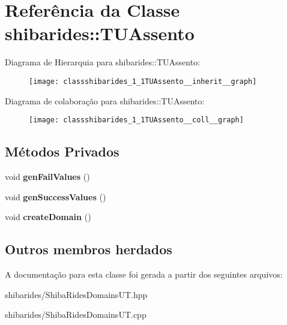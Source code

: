 \hypertarget{classshibarides_1_1TUAssento}{}\section{Referência da Classe shibarides\+:\+:T\+U\+Assento}
\label{classshibarides_1_1TUAssento}


Diagrama de Hierarquia para shibarides\+:\+:T\+U\+Assento\+:\nopagebreak
\begin{figure}[H]
\begin{center}
\leavevmode
\texttt{[image: classshibarides\_1\_1TUAssento\_\_inherit\_\_graph]}
\end{center}
\end{figure}


Diagrama de colaboração para shibarides\+:\+:T\+U\+Assento\+:\nopagebreak
\begin{figure}[H]
\begin{center}
\leavevmode
\texttt{[image: classshibarides\_1\_1TUAssento\_\_coll\_\_graph]}
\end{center}
\end{figure}
\subsection*{Métodos Privados}
\begin{DoxyCompactItemize}
\item 
void {\bfseries gen\+Fail\+Values} ()\hypertarget{classshibarides_1_1TUAssento_a89408b642e71a79865b50f649c7db953}{}\label{classshibarides_1_1TUAssento_a89408b642e71a79865b50f649c7db953}

\item 
void {\bfseries gen\+Success\+Values} ()\hypertarget{classshibarides_1_1TUAssento_a92cebd28fdf14165b5a6492df3dd2619}{}\label{classshibarides_1_1TUAssento_a92cebd28fdf14165b5a6492df3dd2619}

\item 
void {\bfseries create\+Domain} ()\hypertarget{classshibarides_1_1TUAssento_ad335b0325665a7477be93ca4a68f72d0}{}\label{classshibarides_1_1TUAssento_ad335b0325665a7477be93ca4a68f72d0}

\end{DoxyCompactItemize}
\subsection*{Outros membros herdados}


A documentação para esta classe foi gerada a partir dos seguintes arquivos\+:\begin{DoxyCompactItemize}
\item 
shibarides/Shiba\+Rides\+Domains\+U\+T.\+hpp\item 
shibarides/Shiba\+Rides\+Domains\+U\+T.\+cpp\end{DoxyCompactItemize}
